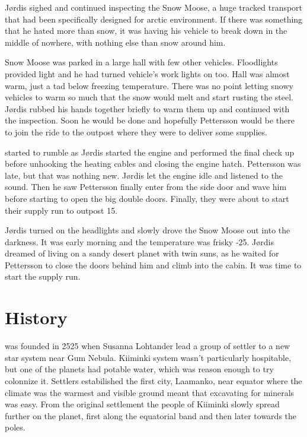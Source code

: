 \documentclass{tufte-book}
\begin{document}
J\o rdis sighed and continued inspecting the Snow Moose, a huge
tracked transport that had been specifically designed for arctic
environment. If there was something that he hated more than snow, it
was having his vehicle to break down in the middle of nowhere, with
nothing else than snow around him.

Snow Moose was parked in a large hall with few other vehicles.
Floodlights provided light and he had turned vehicle's work lights on
too. Hall was almost warm, just a tad below freezing temperature.
There was no point letting snowy vehicles to warm so much that the
snow would melt and start rusting the steel. J\o rdis rubbed his hands
together briefly to warm them up and continued with the inspection.
Soon he would be done and hopefully Pettersson would be there to
join the ride to the outpost where they were to deliver some
supplies.

 started to rumble as J\o rdis started the
engine and performed the final check up before unhooking the heating
cables and closing the engine hatch. Pettersson was late, but that was
nothing new. J\o rdis let the engine idle and listened to the sound.
Then he saw Pettersson finally enter from the side door and wave him
before starting to open the big double doors. Finally, they were about
to start their supply run to outpost 15.

J\o rdis turned on the headlights and slowly drove the Snow Moose out
into the darkness. It was early morning and the temperature was frisky
-25\celsius. J\o rdis dreamed of living on a sandy desert planet with
twin suns, as he waited for Pettersson to close the doors behind him 
and climb into the cabin. It was time to start the supply run.

\chapter{History}
\label{ch:history}

 was founded in 2525 when Susanna Lohtander
lead a group of settler to a new star system near Gum Nebula. Kiiminki system
wasn't particularly hospitable, but one of the planets had potable water,
which was reason enough to try colonnize it. Settlers estabilished the first
city, Laamanko, near equator where the climate was the warmest and visible 
ground meant that excavating for minerals was easy. From the original
settlement the people of Kiiminki slowly spread further on the planet, first
along the equatorial band and then later towards the poles.
\end{document}
